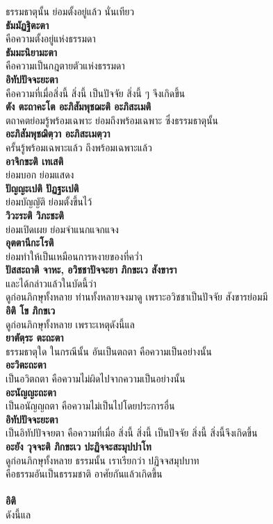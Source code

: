\documentclass[12pt]{article}
\begin{document}
\indent ธรรมธาตุนั้น ย่อมตั้งอยู่แล้ว นั่นเทียว\\
\textbf{ธัมมัฏฐิตะตา}\\
\indent คือความตั้งอยู่แห่งธรรมดา\\
\textbf{ธัมมะนิยามะตา}\\
\indent คือความเป็นกฎตายตัวแห่งธรรมดา\\
\textbf{อิทัปปัจจะยะตา}\\
\indent คือความที่เมื่อสิ่งนี้ สิ่งนี้ เป็นปัจจัย สิ่งนี้ ๆ จึงเกิดขึ้น\\
\textbf{ตัง ตะถาคะโต อะภิสัมพุชฌะติ อะภิสะเมติ}\\
\indent ตถาคตย่อมรู้พร้อมเฉพาะ ย่อมถึงพร้อมเฉพาะ ซึ่งธรรมธาตุนั้น\\
\textbf{อะภิสัมพุชฌิตฺวา อะภิสะเมตฺวา}\\
\indent ครั้นรู้พร้อมเฉพาะแล้ว ถึงพร้อมเฉพาะแล้ว\\
\textbf{อาจิกขะติ เทเสติ}\\
\indent ย่อมบอก ย่อมแสดง\\
\textbf{ปัญญะเปติ ปัฏฐะเปติ}\\
\indent ย่อมบัญญัติ ย่อมตั้งขึ้นไว้\\
\textbf{วิวะระติ วิภะชะติ}\\
\indent ย่อมเปิดเผย ย่อมจำแนกแจกแจง\\
\textbf{อุตตานีกะโรติ}\\
\indent ย่อมทำให้เป็นเหมือนการหงายของที่คว่ำ\\
\textbf{ปัสสะถาติ จาหะ, อวิชชาปัจจะยา ภิกขะเว สังขารา}\\
\indent และได้กล่าวแล้วในบัดนี้ว่า \\
\indent ดูก่อนภิกษุทั้งหลาย ท่านทั้งหลายจงมาดู เพราะอวิชชาเป็นปัจจัย สังขารย่อมมี\\
\textbf{อิติ โข ภิกขเว}\\
\indent ดูก่อนภิกษุทั้งหลาย เพราะเหตุดังนี้แล\\
\textbf{ยาตัตฺระ ตะถะตา}\\
\indent ธรรมธาตุใด ในกรณีนั้น อันเป็นตถตา คือความเป็นอย่างนั้น\\
\textbf{อะวิตะถะตา}\\
\indent เป็นอวิตถตา คือความไม่ผิดไปจากความเป็นอย่างนั้น\\
\textbf{อะนัญญะถะตา}\\
\indent เป็นอนัญญถตา คือความไม่เป็นไปโดยประการอื่น\\
\textbf{อิทัปปัจจะยะตา}\\
\indent เป็นอิทัปปัจจยตา คือความที่เมื่อ สิ่งนี้ สิ่งนี้ เป็นปัจจัย สิ่งนี้ สิ่งนี้จึงเกิดขึ้น\\
\textbf{อะยัง วุจจะติ ภิกขะเว ปะฏิจจะสะมุปปาโท}\\
\indent ดูก่อนภิกษุทั้งหลาย ธรรมนั้น เราเรียกว่า ปฏิจจสมุปบาท \\
\indent คือธรรมอันเป็นธรรมชาติ อาศัยกันแล้วเกิดขึ้น\\
\\
\textbf{อิติ}\\
\indent ดังนี้แล
\end{document}
